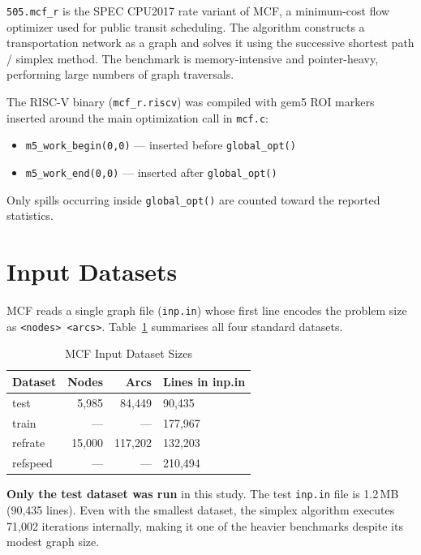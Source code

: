 \documentclass[conference]{IEEEtran}
\begin{document}
\texttt{505.mcf\_r} is the SPEC CPU2017 rate variant of MCF, a
minimum-cost flow optimizer used for public transit scheduling.
The algorithm constructs a transportation network as a graph and
solves it using the successive shortest path / simplex method.
The benchmark is memory-intensive and pointer-heavy, performing
large numbers of graph traversals.

The RISC-V binary (\texttt{mcf\_r.riscv}) was compiled with gem5 ROI
markers inserted around the main optimization call in \texttt{mcf.c}:

\begin{itemize}
    \item \texttt{m5\_work\_begin(0,0)} — inserted before \texttt{global\_opt()}
    \item \texttt{m5\_work\_end(0,0)}   — inserted after  \texttt{global\_opt()}
\end{itemize}

Only spills occurring inside \texttt{global\_opt()} are counted
toward the reported statistics.

\section{Input Datasets}

MCF reads a single graph file (\texttt{inp.in}) whose first line
encodes the problem size as \texttt{<nodes> <arcs>}.
Table~\ref{tab:inputs} summarises all four standard datasets.

\begin{table}[H]
\centering
\caption{MCF Input Dataset Sizes}
\label{tab:inputs}
\begin{tabular}{lrrl}
\toprule
\textbf{Dataset} & \textbf{Nodes} & \textbf{Arcs} & \textbf{Lines in inp.in} \\
\midrule
test     &  5,985 &  84,449 &  90,435 \\
train    & —      & —       & 177,967 \\
refrate  & 15,000 & 117,202 & 132,203 \\
refspeed & —      & —       & 210,494 \\
\bottomrule
\end{tabular}
\end{table}

\textbf{Only the test dataset was run} in this study.
The test \texttt{inp.in} file is 1.2\,MB (90,435 lines).
Even with the smallest dataset, the simplex algorithm executes
71,002 iterations internally, making it one of the heavier
benchmarks despite its modest graph size.
\end{document}
